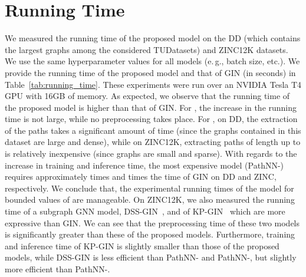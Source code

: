 \documentclass{article}
\theoremstyle{plain}
\theoremstyle{definition}
\theoremstyle{remark}
\newcommand{\eg}{e.\,g., }
\begin{document}
\section{Running Time}\label{sec:running_time}
We measured the running time of the proposed model on the DD (which contains the largest graphs among the considered TUDatasets) and ZINC12K datasets.
We use the same hyperparameter values for all models (\eg batch size, etc.).
We provide the running time of the proposed model and that of GIN (in seconds) in Table~\ref{tab:running_time}.
These experiments were run over an NVIDIA Tesla T4 GPU with 16GB of memory.
As expected, we observe that the running time of the proposed model is higher than that of GIN.
For , the increase in the running time is not large, while no preprocessing takes place.
For , on DD, the extraction of the paths takes a significant amount of time (since the graphs contained in this dataset are large and dense), while on ZINC12K, extracting paths of length up to  is relatively inexpensive (since graphs are small and sparse).
With regards to the increase in training and inference time, the most expensive model (PathNN-) requires approximately  times and  times the time of GIN on DD and ZINC, respectively.
We conclude that, the experimental running times of the model for bounded values of  are manageable.
On ZINC12K, we also measured the running time of a subgraph GNN model, DSS-GIN~\cite{bevilacqua2022equivariant}, and of KP-GIN~\cite{feng2022powerful} which are more expressive than GIN.
We can see that the preprocessing time of these two models is significantly greater than these of the proposed models.
Furthermore, training and inference time of KP-GIN is slightly smaller than those of the proposed models, while DSS-GIN is less efficient than PathNN- and PathNN-, but slightly more efficient than PathNN-.
\end{document}
